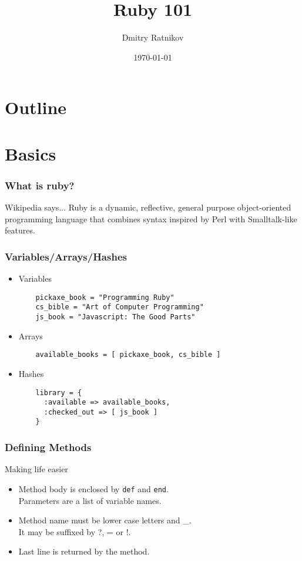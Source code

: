 \documentclass{beamer}
\title{Ruby 101}
\author{Dmitry Ratnikov}
\date{\today}
\begin{document}
\frame{\titlepage}

\section[]{Outline}
\frame{\tableofcontents}

\section{Basics}

\begin{frame}
  \frametitle{What is ruby?}
  \begin{block}{Wikipedia says...}
    Ruby is a \alert<2,3>{dynamic}, \alert<2,4>{reflective}, general purpose \alert<2,5>{object-oriented} programming language that combines syntax 
    inspired by \alert<6>{Perl} with \alert<6>{Smalltalk}-like features. 
  \end{block}
\end{frame}
  
\begin{frame}[fragile]
  \frametitle{Variables/Arrays/Hashes}
  \begin{itemize}
    \item<1->{Variables}
      \begin{verbatim}
	pickaxe_book = "Programming Ruby"
	cs_bible = "Art of Computer Programming"
	js_book = "Javascript: The Good Parts"
      \end{verbatim}
    \item<2->{Arrays}
      \begin{verbatim}
	available_books = [ pickaxe_book, cs_bible ]
      \end{verbatim}
    \item<3->{Hashes}
      \begin{verbatim}
	library = {
	  :available => available_books,
	  :checked_out => [ js_book ] 
	}
      \end{verbatim}
  \end{itemize}
\end{frame}

\begin{frame}[fragile]
  \frametitle{Defining Methods}
  \begin{block}{Making life easier}
    \begin{semiverbatim}
    \end{semiverbatim}
    \begin{itemize}
      \item<2>Method body is enclosed by \texttt{def} and \texttt{end}. \\ Parameters are a list of variable names.
      \item<3>Method name must be lower case letters and \_. \\ It may be suffixed by ?, = or !.
      \item<4>Last line is returned by the method.
    \end{itemize}
  \end{block}
\end{frame}
\end{document}
